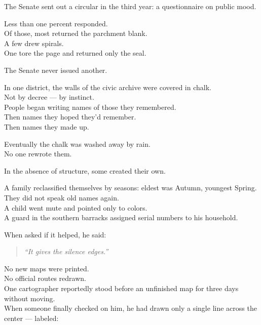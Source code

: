 \documentclass[9pt]{article}
\begin{document}
\vspace{1em}

The Senate sent out a circular in the third year: a questionnaire on public mood.

Less than one percent responded.\\
Of those, most returned the parchment blank.\\
A few drew spirals.\\
One tore the page and returned only the seal.

The Senate never issued another.

\vspace{1em}

In one district, the walls of the civic archive were covered in chalk.\\
Not by decree — by instinct.\\
People began writing names of those they remembered.\\
Then names they hoped they’d remember.\\
Then names they made up.

Eventually the chalk was washed away by rain.\\
No one rewrote them.

\vspace{1em}

In the absence of structure, some created their own.

A family reclassified themselves by seasons: eldest was Autumn, youngest Spring.\\
They did not speak old names again.\\
A child went mute and pointed only to colors.\\
A guard in the southern barracks assigned serial numbers to his household.

When asked if it helped, he said:

\begin{quote}
\textit{“It gives the silence edges.”}
\end{quote}

\vspace{1em}

No new maps were printed.\\
No official routes redrawn.\\
One cartographer reportedly stood before an unfinished map for three days without moving.\\
When someone finally checked on him, he had drawn only a single line across the center — labeled:
\end{document}
